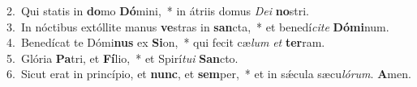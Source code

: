 {2.~}Qui statis in \textbf{do}mo \textbf{Dó}mini,~* in átriis domus \textit{De}\textit{i} \textbf{no}stri.\\
{3.~}In nóctibus extóllite manus \textbf{ve}stras in \textbf{san}cta,~* et benedí\textit{ci}\textit{te} \textbf{Dó}\textbf{mi}num.\\
{4.~}Benedícat te Dómi\textbf{nus} ex \textbf{Si}on,~* qui fecit cæ\textit{lum} \textit{et} \textbf{ter}ram.\\
{5.~}Glória \textbf{Pa}tri, et \textbf{Fí}lio,~* et Spirí\textit{tu}\textit{i} \textbf{San}cto.\\
{6.~}Sicut erat in princípio, et \textbf{nunc}, et \textbf{sem}per,~* et in sǽcula sæcu\textit{ló}\textit{rum}. \textbf{A}men.\\
